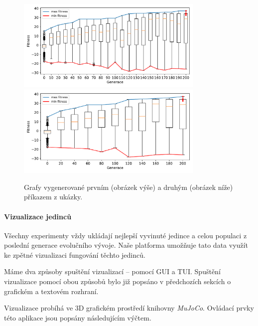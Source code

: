 \begin{figure}[h!]
    \centering
    \includegraphics[width=0.8\textwidth]{../img/experiment2_serial_10ticks.pdf}
    \includegraphics[width=0.8\textwidth]{../img/experiment2_serial_20ticks.pdf}
    \caption{Grafy vygenerované prvním (obrázek výše) a druhým (obrázek níže)
    příkazem z ukázky.}
    \label{doc_23_seasoning_fig_show}
\end{figure}

\paragraph{Vizualizace jedinců} \label{doc_23_visualization}
Všechny experimenty vždy ukládají nejlepší vyvinuté jedince a celou populaci z
poslední generace evolučního vývoje. Naše platforma umožňuje tato data využít
ke zpětné vizualizaci fungování těchto jedinců. 

Máme dva způsoby spuštění vizualizací -- pomocí GUI a TUI. Spuštění
vizualizace pomocí obou způsobů bylo již popsáno v předchozích sekcích o
grafickém a textovém rozhraní. 

Vizualizace probíhá ve 3D grafickém prostředí knihovny \emph{MuJoCo}. Ovládací
prvky této aplikace jsou popsány následujícím výčtem.

